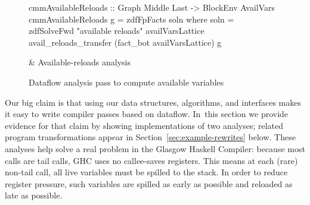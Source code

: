 \documentclass[blockstyle,preprint,nocopyrightspace]{sigplanconf}
\newcommand\secref[1]{Section~\ref{sec:#1}}
\newcommand\figlabel[1]{\label{fig:#1}}
\begin{document}
\begin{figure*}
\begin{codetable}
\T\begin{code}
cmmAvailableReloads :: Graph Middle Last -> BlockEnv AvailVars
cmmAvailableReloads g = zdfFpFacts soln
  where soln = zdfSolveFwd "available reloads" availVarsLattice 
               avail_reloads_transfer (fact_bot availVarsLattice) g
\end{code}\B
& Available-reloads analysis\\

\end{codetable}
\caption{Dataflow analysis pass to compute available variables}
\figlabel{avail-all}
\figlabel{avail}
\figlabel{avail-lattice}
\figlabel{avail-gen-kill}
\figlabel{avail-transfers}
\figlabel{avail-running}
\end{figure*}

% 
% 
% 
% 


Our big claim is that using our data structures, algorithms, and
interfaces makes it easy to write compiler passes based on dataflow.
In~this section we provide evidence for that claim by showing
implementations of two analyses;
related program transformations appear in \secref{example-rewrites}
below. 
These analyses help solve a real problem in the Glasgow Haskell
Compiler:
because most calls are tail calls, GHC uses no 
callee-saves registers.
This means at each (rare) non-tail call, all live
variables must be spilled to the stack.
In order to reduce register pressure,
such variables are spilled as early as possible and reloaded as late as possible.
\end{document}
